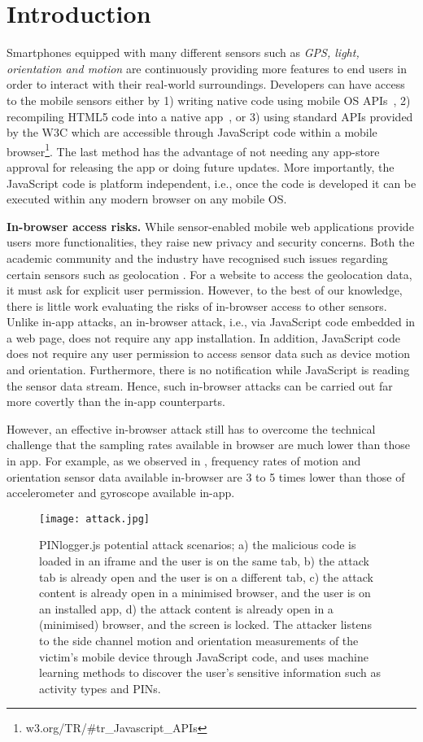 \documentclass[10pt,twocolumn]{article}
\begin{document}
\section{Introduction}
\label{Intro}
Smartphones equipped with many different sensors such as \textit{GPS, light, orientation and motion} are continuously providing more features to end users in order to interact with their real-world surroundings. Developers can have access to the mobile sensors either by 
1) writing native code using mobile OS APIs~\cite{AndDev}, 
2) recompiling HTML5 code into a native app~\cite{CodeInjection}, or 
3) using standard APIs provided by the W3C which are accessible through JavaScript code within a mobile browser\footnote{w3.org/TR/\#tr\_Javascript\_APIs}. 
The last method has the advantage of not needing any app-store approval for releasing the app or doing future updates. More importantly, the JavaScript code is platform independent, i.e., once the  code is developed it can be executed within any modern browser on any mobile OS. 

\textbf{In-browser access risks.} While sensor-enabled mobile web applications provide users more functionalities, they raise new privacy and security concerns. 
Both the academic community and the industry have recognised such issues regarding certain sensors such as geolocation \cite{GPS}. For a website to access the geolocation data, it must ask for explicit user permission. However, to the best of our knowledge, there is little work evaluating the risks of in-browser access to other sensors. Unlike in-app attacks, an in-browser attack, i.e., via JavaScript code embedded in a web page, does not require any app installation. In addition, JavaScript code does not require any user permission to access sensor data such as device motion and orientation. Furthermore, there is no notification while JavaScript is reading the sensor data stream. Hence, such in-browser attacks can be carried out far more covertly than the in-app counterparts. 

However, an effective in-browser attack still has to overcome the technical challenge that the sampling rates available in browser are much lower than those in app. For example, as we observed in \cite{Mehrnezhad}, frequency rates of motion and orientation sensor data available in-browser are 3 to 5 times lower than those of accelerometer and gyroscope available in-app. 
\begin{figure*}[t]
	\centering
	\texttt{[image: attack.jpg]}
	\caption{ 
	PINlogger.js potential attack scenarios; a) the malicious code is loaded in an iframe and the user is on the same tab, b) the attack tab is already open and the user is on a different tab, c) the attack content is already open in a minimised browser, and the user is on an installed app, d) the attack content is already open in a (minimised) browser, and the screen is locked.  
	The attacker listens to the side channel motion and orientation measurements of the victim's mobile device through JavaScript code, and uses machine learning methods to discover the user's sensitive information such as activity types and PINs.
	}  
		\label{attack}
\end{figure*}
\end{document}
